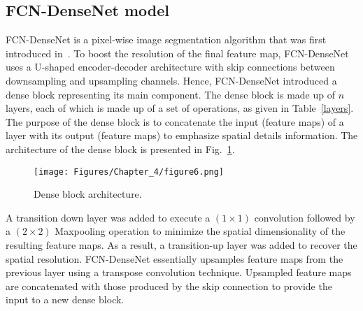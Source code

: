 \subsection{FCN-DenseNet model}
FCN-DenseNet is a pixel-wise image segmentation algorithm that was first introduced in~\cite{Jegou}.
To boost the resolution of the final feature map, FCN-DenseNet uses a U-shaped encoder-decoder architecture with skip connections between downsampling and upsampling channels.
Hence, FCN-DenseNet introduced a dense block representing its main component.
The dense block is made up of \(n\) layers, each of which is made up of a set of operations, as given in Table~\ref{layers}.
The purpose of the dense block is to concatenate the input (feature maps) of a layer with its output (feature maps) to emphasize spatial details information.
The architecture of the dense block is presented in Fig.~\ref{dense_block}. 
\begin{figure} [h!]
	\begin{center}
		\texttt{[image: Figures/Chapter\_4/figure6.png]}
	\end{center}
	\caption{Dense block architecture.} 
	\label{dense_block}
\end{figure}

A transition down layer was added to execute a \((1\times 1)\) convolution followed by a \((2\times 2)\) Maxpooling operation to minimize the spatial dimensionality of the resulting feature maps.
As a result, a transition-up layer was added to recover the spatial resolution.
FCN-DenseNet essentially upsamples feature maps from the previous layer using a transpose convolution technique.
Upsampled feature maps are concatenated with those produced by the skip connection to provide the input to a new dense block.

